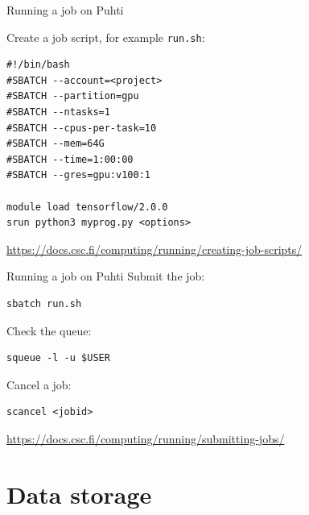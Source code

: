 \documentclass[aspectratio=1610,14pt]{beamer}
\newcommand{\link}[1]{\alert{\url{#1}}}
\begin{document}
\begin{frame}[fragile]{Running a job on Puhti}

  Create a job script, for example {\tt run.sh}:
  
\begin{verbatim}
#!/bin/bash
#SBATCH --account=<project>
#SBATCH --partition=gpu
#SBATCH --ntasks=1
#SBATCH --cpus-per-task=10
#SBATCH --mem=64G
#SBATCH --time=1:00:00
#SBATCH --gres=gpu:v100:1

module load tensorflow/2.0.0
srun python3 myprog.py <options>
\end{verbatim}

{\small \link{https://docs.csc.fi/computing/running/creating-job-scripts/}}
\end{frame}

\begin{frame}[fragile]{Running a job on Puhti}
  Submit the job:
\begin{verbatim}
sbatch run.sh
\end{verbatim}
  \vfill
  
  Check the queue:
\begin{verbatim}
squeue -l -u $USER
\end{verbatim}
  \vfill
  
  Cancel a job:
\begin{verbatim}
scancel <jobid>
\end{verbatim}

  {\small \link{https://docs.csc.fi/computing/running/submitting-jobs/}}
\end{frame}

\section{Data storage}
\end{document}
